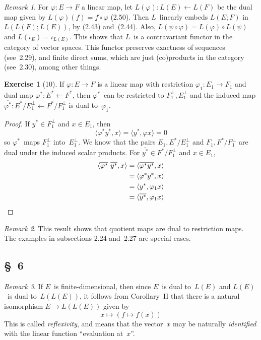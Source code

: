 \documentclass[letterpaper,12pt]{article}
\newcommand{\from}{\leftarrow}
\newcommand{\after}{\circ}
\newcommand{\sprod}[2]{\langle#1,#2\rangle}
\newcommand{\oc}[1]{#1^{\perp}}
\newcommand{\proj}[1]{\overline{#1}}
\theoremstyle{definition}
\newtheorem*{exer}{Exercise}
\theoremstyle{remark}
\newtheorem*{rmk}{Remark}
\begin{document}
\begin{rmk}
For \(\varphi:E\to F\) a linear map, let \(L(\varphi):L(E)\from L(F)\) be the dual map given by \(L(\varphi)(f)=f\after\varphi\) (2.50). Then \(L\)~linearly embeds \(L(E;F)\) in \(L(L(F);L(E))\), by (2.43) and~(2.44). Also, \(L(\psi\after\varphi)=L(\varphi)\after L(\psi)\) and \(L(\iota_{E})=\iota_{L(E)}\). This shows that \(L\)~is a contravariant functor in the category of vector spaces. This functor preserves exactness of sequences (see~2.29), and finite direct sums, which are just (co)products in the category (see~2.30), among other things.
\end{rmk}

\begin{exer}[10]
If \(\varphi:E\to F\) is a linear map with restriction \(\varphi_1:E_1\to F_1\) and dual map \(\varphi^*:E^*\from F^*\), then \(\varphi^*\)~can be restricted to \(\oc{F_1},\oc{E_1}\) and the induced map \(\proj{\varphi^*}:E^*/\oc{E_1}\from F^*/\oc{F_1}\) is dual to~\(\varphi_1\).
\end{exer}
\begin{proof}
If \(y^*\in\oc{F_1}\) and \(x\in E_1\), then
\[\sprod{\varphi^*y^*}{x}=\sprod{y^*}{\varphi x}=0\]
so \(\varphi^*\)~maps \(\oc{F_1}\) into~\(\oc{E_1}\). We know that the pairs \(E_1,E^*/\oc{E_1}\) and \(F_1,F^*/\oc{F_1}\) are dual under the induced scalar products. For \(\proj{y^*}\in F^*/\oc{F_1}\) and \(x\in E_1\),
\begin{align*}
\sprod{\proj{\varphi^*}\ \proj{y^*}}{x}&=\sprod{\proj{\varphi^* y^*}}{x}\\
	&=\sprod{\varphi^* y^*}{x}\\
	&=\sprod{y^*}{\varphi_1 x}\\
	&=\sprod{\proj{y^*}}{\varphi_1 x}\qedhere
\end{align*}
\end{proof}
\begin{rmk}
This result shows that quotient maps are dual to restriction maps. The examples in subsections 2.24 and~2.27 are special cases.
\end{rmk}

\subsection*{\S~6}
\begin{rmk}
If \(E\)~is finite-dimensional, then since \(E\)~is dual to~\(L(E)\) and \(L(E)\)~is dual to~\(L(L(E))\), it follows from Corollary~II that there is a natural isomorphism \(E\to L(L(E))\) given by
\[x\mapsto(f\mapsto f(x))\]
This is called \emph{reflexivity}, and means that the vector~\(x\) may be naturally \emph{identified} with the linear function ``evaluation at~\(x\)''.
\end{rmk}
\end{document}
